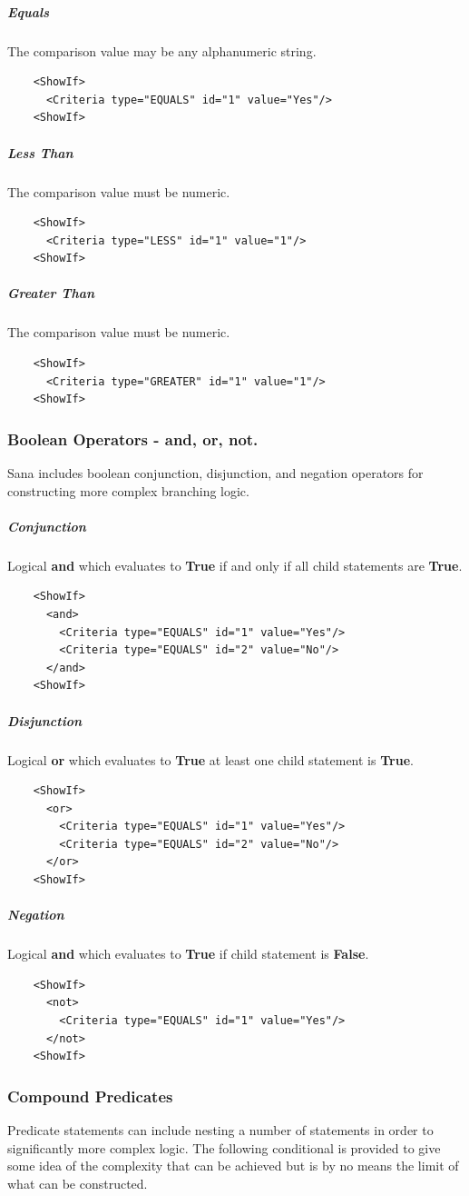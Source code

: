 \documentclass[a4paper,10pt]{article}
\begin{document}
\subparagraph{Equals} The comparison value may be any alphanumeric string.
\begin{verbatim}
    <ShowIf>
      <Criteria type="EQUALS" id="1" value="Yes"/>
    <ShowIf>
\end{verbatim}

\subparagraph{Less Than} The comparison value must be numeric.
\begin{verbatim}
    <ShowIf>
      <Criteria type="LESS" id="1" value="1"/>
    <ShowIf>
\end{verbatim}

\subparagraph{Greater Than} The comparison value must be numeric.
\begin{verbatim}
    <ShowIf>
      <Criteria type="GREATER" id="1" value="1"/>
    <ShowIf>
\end{verbatim}

\subsubsection{Boolean Operators - and, or, not.}
Sana includes boolean conjunction, disjunction, and negation operators for
constructing more complex branching logic.

\subparagraph{Conjunction} Logical \textbf{and} which evaluates to \textbf{True}
if and only if all child statements are \textbf{True}.
\begin{verbatim}
    <ShowIf>
      <and>
        <Criteria type="EQUALS" id="1" value="Yes"/>
        <Criteria type="EQUALS" id="2" value="No"/>
      </and>
    <ShowIf>
\end{verbatim}

\subparagraph{Disjunction} Logical \textbf{or} which evaluates to \textbf{True}
at least one child statement is \textbf{True}.
\begin{verbatim}
    <ShowIf>
      <or>
        <Criteria type="EQUALS" id="1" value="Yes"/>
        <Criteria type="EQUALS" id="2" value="No"/>
      </or>
    <ShowIf>
\end{verbatim}

\subparagraph{Negation} Logical \textbf{and} which evaluates to \textbf{True}
if  child statement is \textbf{False}.
\begin{verbatim}
    <ShowIf>
      <not>
        <Criteria type="EQUALS" id="1" value="Yes"/>
      </not>
    <ShowIf>
\end{verbatim}

\subsubsection{Compound Predicates}
Predicate statements can include nesting a number of statements in order to
significantly more complex logic. The following conditional is provided to
give some idea of the complexity that can be achieved but is by no means the
limit of what can be constructed. 
\end{document}
